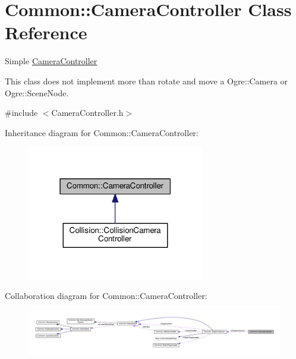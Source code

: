 \hypertarget{class_common_1_1_camera_controller}{}\section{Common\+:\+:Camera\+Controller Class Reference}
\label{class_common_1_1_camera_controller}


Simple \hyperlink{class_common_1_1_camera_controller}{Camera\+Controller}

This class does not implement more than rotate and move a Ogre\+::\+Camera or Ogre\+::\+Scene\+Node.  




{\ttfamily \#include $<$Camera\+Controller.\+h$>$}



Inheritance diagram for Common\+:\+:Camera\+Controller\+:\nopagebreak
\begin{figure}[H]
\begin{center}
\leavevmode
\includegraphics[width=219pt]{class_common_1_1_camera_controller__inherit__graph}
\end{center}
\end{figure}


Collaboration diagram for Common\+:\+:Camera\+Controller\+:\nopagebreak
\begin{figure}[H]
\begin{center}
\leavevmode
\includegraphics[width=350pt]{class_common_1_1_camera_controller__coll__graph}
\end{center}
\end{figure}
